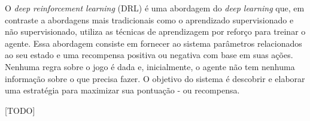  O \textit{deep reinforcement learning} (DRL) é uma abordagem do \textit{deep learning} que, em contraste a abordagens mais tradicionais como o aprendizado supervisionado e não supervisionado, utiliza as técnicas de aprendizagem por reforço para treinar o agente. Essa abordagem consiste em fornecer ao sistema parâmetros relacionados ao seu estado e uma recompensa positiva ou negativa com base em suas ações. Nenhuma regra sobre o jogo é dada e, inicialmente, o agente não tem nenhuma informação sobre o que precisa fazer. O objetivo do sistema é descobrir e elaborar uma estratégia para maximizar sua pontuação - ou recompensa.


 [TODO]




